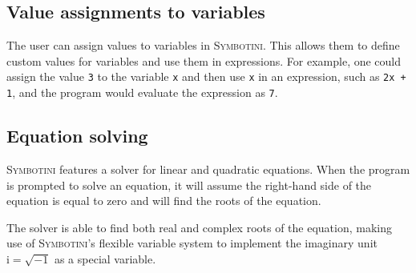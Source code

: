 \subsection{Value assignments to variables}\label{subsec:value-assignments}

The user can assign values to variables in \textsc{Symbotini}. This allows them to define custom values for variables and use them in expressions. For example, one could assign the value \verb|3| to the variable \verb|x| and then use \verb|x| in an expression, such as \verb|2x + 1|, and the program would evaluate the expression as \verb|7|.

\subsection{Equation solving}\label{subsec:equation-solving}

\textsc{Symbotini} features a solver for linear and quadratic equations. When the program is prompted to solve an equation, it will assume the right-hand side of the equation is equal to zero and will find the roots of the equation.

The solver is able to find both real and complex roots of the equation, making use of \textsc{Symbotini}'s flexible variable system to implement the imaginary unit $\mathrm{i} = \sqrt{-1}$ as a special variable.
